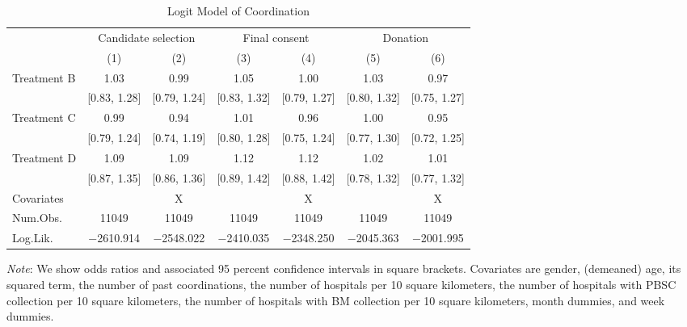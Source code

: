 \documentclass [12pt, a4paper]{article}
\begin{document}
\begin{table}[H]

\caption{\label{tab:coordinate-logit}Logit Model of Coordination}
\centering
\fontsize{9}{11}\selectfont
\begin{threeparttable}
\begin{tabular}[t]{lcccccc}
\toprule
\multicolumn{1}{c}{ } & \multicolumn{2}{c}{Candidate selection} & \multicolumn{2}{c}{Final consent} & \multicolumn{2}{c}{Donation} \\
\cmidrule(l{3pt}r{3pt}){2-3} \cmidrule(l{3pt}r{3pt}){4-5} \cmidrule(l{3pt}r{3pt}){6-7}
  & (1) & (2) & (3) & (4) & (5) & (6)\\
\midrule
Treatment B & \num{1.03} & \num{0.99} & \num{1.05} & \num{1.00} & \num{1.03} & \num{0.97}\\
 & {}[\num{0.83}, \num{1.28}] & {}[\num{0.79}, \num{1.24}] & {}[\num{0.83}, \num{1.32}] & {}[\num{0.79}, \num{1.27}] & {}[\num{0.80}, \num{1.32}] & {}[\num{0.75}, \num{1.27}]\\
Treatment C & \num{0.99} & \num{0.94} & \num{1.01} & \num{0.96} & \num{1.00} & \num{0.95}\\
 & {}[\num{0.79}, \num{1.24}] & {}[\num{0.74}, \num{1.19}] & {}[\num{0.80}, \num{1.28}] & {}[\num{0.75}, \num{1.24}] & {}[\num{0.77}, \num{1.30}] & {}[\num{0.72}, \num{1.25}]\\
Treatment D & \num{1.09} & \num{1.09} & \num{1.12} & \num{1.12} & \num{1.02} & \num{1.01}\\
 & {}[\num{0.87}, \num{1.35}] & {}[\num{0.86}, \num{1.36}] & {}[\num{0.89}, \num{1.42}] & {}[\num{0.88}, \num{1.42}] & {}[\num{0.78}, \num{1.32}] & {}[\num{0.77}, \num{1.32}]\\
\midrule
Covariates &  & X &  & X &  & X\\
Num.Obs. & \num{11049} & \num{11049} & \num{11049} & \num{11049} & \num{11049} & \num{11049}\\
Log.Lik. & \num{-2610.914} & \num{-2548.022} & \num{-2410.035} & \num{-2348.250} & \num{-2045.363} & \num{-2001.995}\\
\bottomrule
\end{tabular}
\begin{tablenotes}
\item \emph{Note}: We show odds ratios and associated 95 percent confidence intervals in square brackets. Covariates are gender, (demeaned) age, its squared term, the number of past coordinations, the number of hospitals per 10 square kilometers, the number of hospitals with PBSC collection per 10 square kilometers, the number of hospitals with BM collection per 10 square kilometers, month dummies, and week dummies.
\end{tablenotes}
\end{threeparttable}
\end{table}
\end{document}
